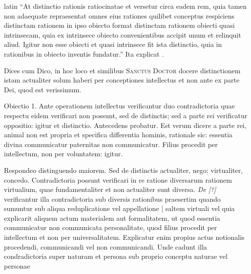 \begin{otherlanguage*}{latin}
\pstart
\enquote{At distinctio rationis ratiocinatae et versetur circa eadem rem, quia tamen non adaequate repraesentat omnes eius rationes quilibet conceptus respiciens distinctam rationem in ipso obiecto format distinctam rationem obiecti quasi intrinsecam, quia ex intrinsece obiecto convenientibus accipit unum et relinquit aliud. Igitur non esse obiecti et quasi intrinsece fit ista distinctio, quia in rationibus in obiecto inventis fundatur.} Ita explicat . 
\pend

\pstart
Dices cum  Dico, in hoc loco et similibus \textsc{Sanctus Doctor} docere distinctionem istam actualiter solum haberi per conceptiones intellectus et non ante ex parte Dei, quod est verissimum. 
\pend

\pstart
Obiectio 1. Ante operationem intellectus verificantur duo contradictoria quae respectu eidem verificari non possunt, sed de distinctis; sed a parte rei verificatur oppositio:
igitur et distinctio. Antecedens probatur. Est verum dicere a parte rei, animal non est propria et specifica differentia hominis, rationale sic:
essentia divina communicatur paternitas non communicatur. Filius procedit per intellectum, non per voluntatem:
igitur. 
\pend

\pstart
Respondeo distinguendo maiorem. Sed de distinctis actualiter, nego; virtualiter, concedo. Contradictoria possunt verificari in re ratione diversarum rationem virtualium, quae fundamentaliter et non actualiter sunt diversa. \emph{De [?]} verificantur illa contradictoria sub diversis rationibus praesertim quando sumuntur sub aliqua reduplicatione vel appellatione \textnormal{|} saltem virtuali vel quia explicarit aliquem actum materialem aut formalitatem, ut quod essentia communicatur non communicata personalitate, quod filius procedit per intellectum et non per universalitatem. Explicatur enim propius actus notionalis procedendi, communicandi vel non communicandi. Unde cadunt illa condradictoria super naturam et persona sub proprio conceptu naturae vel personae 
\pend


\end{otherlanguage*}
